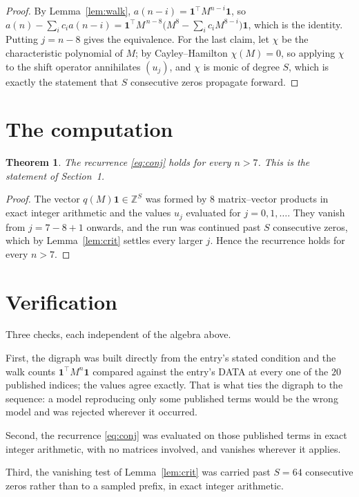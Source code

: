 \documentclass[11pt,a4paper]{article}
\theoremstyle{plain}
\newtheorem{theorem}{Theorem}
\theoremstyle{definition}
\begin{document}
\begin{proof}
By Lemma~\ref{lem:walk}, $a(n-i)=\mathbf{1}^{\!\top}M^{n-i}\mathbf{1}$, so
$a(n)-\sum_i c_i a(n-i)
=\mathbf{1}^{\!\top}M^{\,n-8}\bigl(M^{8}-\sum_i c_i M^{8-i}\bigr)
\mathbf{1}$, which is the identity. Putting $j=n-8$ gives the equivalence. For the
last claim, let $\chi$ be the characteristic polynomial of $M$; by Cayley--Hamilton
$\chi(M)=0$, so applying $\chi$ to the shift operator annihilates $(u_j)$, and $\chi$ is
monic of degree $S$, which is exactly the statement that $S$ consecutive zeros propagate
forward.
\end{proof}

\section{The computation}

\begin{theorem}
The recurrence \eqref{eq:conj} holds for every $n>7$. This is the statement of
Section~1.
\end{theorem}

\begin{proof}
The vector $q(M)\mathbf{1}\in\mathbb{Z}^{S}$ was formed by $8$ matrix--vector
products in exact integer arithmetic and the values $u_j$ evaluated for
$j=0,1,\dots$. They vanish from $j=7-8+1$ onwards, and the run was continued past
$S$ consecutive zeros, which by Lemma~\ref{lem:crit} settles every larger $j$. Hence the
recurrence holds for every $n>7$.
\end{proof}

\section{Verification}

Three checks, each independent of the algebra above.

First, the digraph was built directly from the entry's stated condition and the walk counts
$\mathbf{1}^{\!\top}M^{n}\mathbf{1}$ compared against the entry's DATA at every one of
the $20$ published indices; the values agree exactly. That is what ties the digraph to
the sequence: a model reproducing only some published terms would be the wrong model and
was rejected wherever it occurred.

Second, the recurrence \eqref{eq:conj} was evaluated on those published terms in exact
integer arithmetic, with no matrices involved, and vanishes wherever it applies.

Third, the vanishing test of Lemma~\ref{lem:crit} was carried past $S=64$ consecutive
zeros rather than to a sampled prefix, in exact integer arithmetic.
\end{document}
